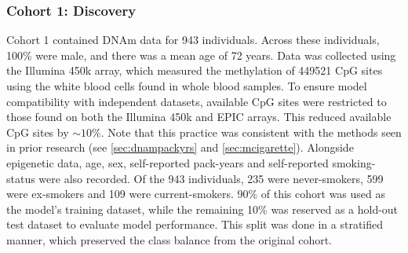 \documentclass[draft]{article} %
\begin{document}
\subsubsection{Cohort 1: Discovery}
Cohort 1 contained DNAm data for 943 individuals. Across these individuals, 100\% were male, and there was a mean age of 72 years. Data was collected using the Illumina 450k array, which measured the methylation of \num{449521} CpG sites using the white blood cells found in whole blood samples. To ensure model compatibility with independent datasets, available CpG sites were restricted to those found on both the Illumina 450k and EPIC arrays. This reduced available CpG sites by \(\sim\!10\%\). Note that this practice was consistent with the methods seen in prior research (see \ref{sec:dnampackyrs} and \ref{sec:mcigarette}). Alongside epigenetic data, age, sex, self-reported pack-years and self-reported smoking-status were also recorded. Of the 943 individuals, 235 were never-smokers, 599 were ex-smokers and 109 were current-smokers. 90\% of this cohort was used as the model's training dataset, while the remaining 10\% was reserved as a hold-out test dataset to evaluate model performance. This split was done in a stratified manner, which preserved the class balance from the original cohort.

\end{document}
